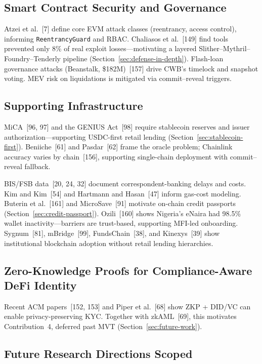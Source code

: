 \documentclass[12pt,a4paper]{report}
\begin{document}
\subsection{Smart Contract Security and Governance}

Atzei et al.~[7] define core EVM attack classes (reentrancy, access control), informing \texttt{ReentrancyGuard} and RBAC. Chaliasos et al.~[149] find tools prevented only 8\% of real exploit losses---motivating a layered Slither--Mythril--Foundry--Tenderly pipeline (Section~\ref{sec:defense-in-depth}). Flash-loan governance attacks (Beanstalk, \$182M)~[157] drive CWB's timelock and snapshot voting. MEV risk on liquidations is mitigated via commit--reveal triggers.

\subsection{Supporting Infrastructure}
\label{sec:lit-stablecoin-reg}
\label{sec:lit-sbt}
\label{sec:lit-institutional}

MiCA~[96, 97] and the GENIUS Act~[98] require stablecoin reserves and issuer authorization---supporting USDC-first retail lending (Section~\ref{sec:stablecoin-first}). Beniiche~[61] and Pasdar~[62] frame the oracle problem; Chainlink accuracy varies by chain~[156], supporting single-chain deployment with commit--reveal fallback.

BIS/FSB data~[20, 24, 32] document correspondent-banking delays and costs. Kim and Kim~[54] and Hartmann and Hasan~[47] inform gas-cost modeling. Buterin et al.~[161] and MicroSave~[91] motivate on-chain credit passports (Section~\ref{sec:credit-passport}). Ozili~[160] shows Nigeria's eNaira had 98.5\% wallet inactivity---barriers are trust-based, supporting MFI-led onboarding. Sygnum~[81], mBridge~[99], FundsChain~[38], and Kinexys~[39] show institutional blockchain adoption without retail lending hierarchies.

\subsection{Zero-Knowledge Proofs for Compliance-Aware DeFi Identity}
\label{sec:lit-zkp-defi}

Recent ACM papers~[152, 153] and Piper et al.~[68] show ZKP + DID/VC can enable privacy-preserving KYC. Together with zkAML~[69], this motivates Contribution~4, deferred past MVT (Section~\ref{sec:future-work}).

\subsection{Future Research Directions Scoped}
\label{sec:lit-gnn}
\label{sec:lit-fl}
\label{sec:lit-retail-payments}
\label{sec:lit-llm}
\label{sec:harness-lit}
\end{document}

